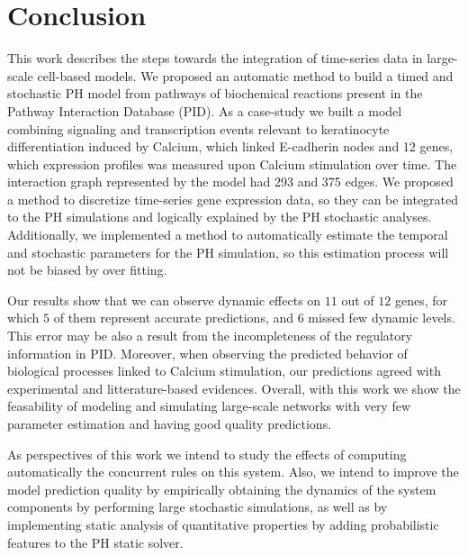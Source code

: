 \section{Conclusion}
This work describes the steps towards the integration of time-series data in large-scale cell-based models. 
We proposed an automatic method to build a timed and stochastic PH model from pathways of biochemical reactions present in 
the Pathway Interaction Database (PID). 
%
As a case-study we built a model combining signaling and transcription events relevant to keratinocyte differentiation induced by Calcium, which linked E-cadherin nodes and 12 genes, which 
expression profiles was measured upon Calcium stimulation over time. The interaction graph represented by the model had 293 and 375 edges.
%
We proposed a method to discretize time-series gene expression data, so they can be integrated to the PH simulations and logically explained by the PH stochastic analyses. 
%
Additionally, we implemented a method to automatically estimate the temporal and stochastic
parameters for the PH simulation, so this estimation process will not be biased by over fitting. 
%

Our results show that  we can observe dynamic effects on $11$ out of $12$ genes, for which $5$ of them represent accurate predictions, and $6$ missed few dynamic levels.
This error may be also a result from the incompleteness of the regulatory information in PID.
Moreover, when observing the predicted behavior of biological processes linked to Calcium stimulation, our predictions agreed with experimental and litterature-based evidences.
Overall, with this work we show the feasability of modeling and simulating large-scale networks with very few parameter estimation 
and having good quality predictions.

As perspectives of this work we intend to study the effects of computing automatically the concurrent rules on this system.
Also, we intend to improve the model prediction quality by empirically obtaining the dynamics of the system components by performing large stochastic simulations, as well 
as by implementing static analysis of quantitative properties by adding probabilistic features to the PH static solver.

